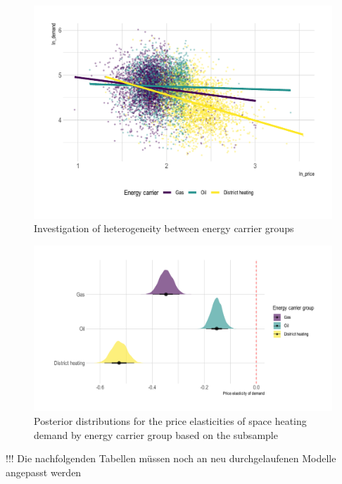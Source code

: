 \documentclass[12pt,twoside]{reedthesis}
\begin{document}
\begin{figure}

{\centering \includegraphics[width=1\linewidth]{figure/carrier_heterogeneity_plot} 

}

\caption{Investigation of heterogeneity between energy carrier groups}\label{fig:heterogeneity-energy-carrier-plot}
\end{figure}
\begin{figure}

{\centering \includegraphics[width=1\linewidth]{figure/posterior-distribution-interaction} 

}

\caption{Posterior distributions for the price elasticities of space heating demand by energy carrier group based on the subsample}\label{fig:posterior-distribution-interaction}
\end{figure}
!!! Die nachfolgenden Tabellen müssen noch an neu durchgelaufenen Modelle angepasst werden
\end{document}
